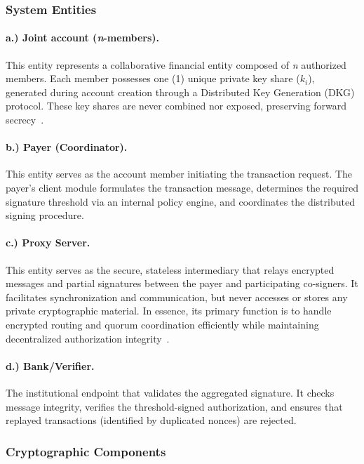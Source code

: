 \documentclass[a4paper]{scl-article}
\begin{document}
\subsubsection{System Entities}
\label{sect:meth2_a}
\paragraph{a.) Joint account (\textit{n}-members).}This entity represents a collaborative financial entity composed of \textit{n} authorized members. Each member possesses one (1) unique private key share ($k_i$), generated during account creation through a Distributed Key Generation (DKG) protocol. These key shares are never combined nor exposed, preserving forward secrecy~\cite{ruffing2014}.

\paragraph{b.) Payer (Coordinator).}  
This entity serves as the account member initiating the transaction request. The payer’s client module formulates the transaction message, determines the required signature threshold via an internal policy engine, and coordinates the distributed signing procedure.

\paragraph{c.) Proxy Server.}  
This entity serves as the secure, stateless intermediary that relays encrypted messages and partial signatures between the payer and participating co-signers. It facilitates synchronization and communication, but never accesses or stores any private cryptographic material. In essence, its primary function is to handle encrypted routing and quorum coordination efficiently while maintaining decentralized authorization integrity~\cite{chen2011}.

\paragraph{d.) Bank/Verifier.}  
The institutional endpoint that validates the aggregated signature. It checks message integrity, verifies the threshold-signed authorization, and ensures that replayed transactions (identified by duplicated nonces) are rejected.

\subsubsection{Cryptographic Components}
\label{sect:meth2_b}
\end{document}
